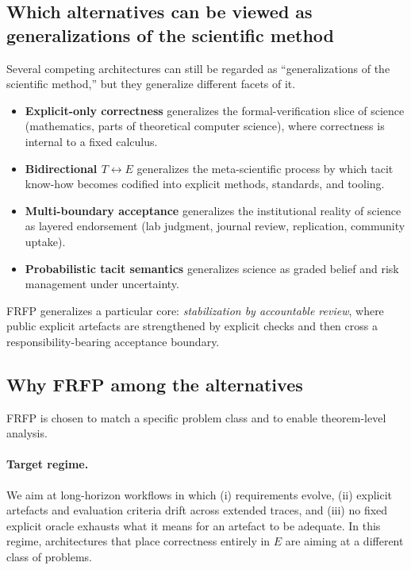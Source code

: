 \subsection{Which alternatives can be viewed as generalizations of the scientific method}

Several competing architectures can still be regarded as ``generalizations of the scientific method,''
but they generalize different facets of it.

\begin{itemize}[leftmargin=2em]
  \item \textbf{Explicit-only correctness} generalizes the formal-verification slice of science (mathematics, parts of theoretical computer science), where correctness is internal to a fixed calculus.
  \item \textbf{Bidirectional \(T\leftrightarrow E\)} generalizes the meta-scientific process by which tacit know-how becomes codified into explicit methods, standards, and tooling.
  \item \textbf{Multi-boundary acceptance} generalizes the institutional reality of science as layered endorsement (lab judgment, journal review, replication, community uptake).
  \item \textbf{Probabilistic tacit semantics} generalizes science as graded belief and risk management under uncertainty.
\end{itemize}
FRFP generalizes a particular core: \emph{stabilization by accountable review}, where public explicit
artefacts are strengthened by explicit checks and then cross a responsibility-bearing acceptance
boundary.

\subsection{Why FRFP among the alternatives}

FRFP is chosen to match a specific problem class and to enable theorem-level analysis.

\paragraph{Target regime.}
We aim at long-horizon workflows in which (i) requirements evolve, (ii) explicit artefacts and
evaluation criteria drift across extended traces, and (iii) no fixed explicit oracle exhausts what it
means for an artefact to be adequate. In this regime, architectures that place correctness entirely in
\(E\) are aiming at a different class of problems.

